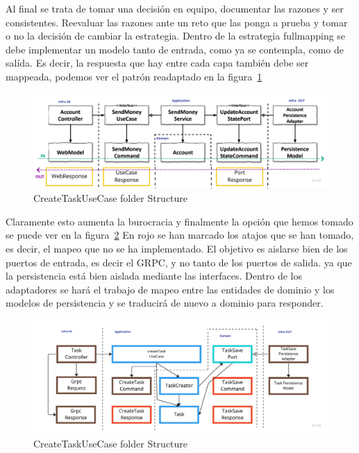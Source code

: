 Al final se trata de tomar una decisión en equipo, documentar las razones y ser consistentes. Reevaluar las razones ante un reto que las ponga a prueba y tomar o no la decisión de cambiar la estrategia. Dentro de la estrategia fullmapping se debe implementar un modelo tanto de entrada, como ya se contempla, como de salída. Es decir, la respuesta que hay entre cada capa también debe ser mappeada, podemos ver el patrón readaptado en la figura~\cref{fig:GetHandMapping}

\begin{figure}[H]
    \centering
    \includegraphics[height=0.2\textheight]{./part/Ejecucion/Seguimiento/CreateTaskUseCase/img/PFM - GetHandMapping}
    \caption{CreateTaskUseCase folder Structure\cite{TomHombergs2019GYHD}}\label{fig:GetHandMapping}
\end{figure}

Claramente esto aumenta la burocracia y finalmente la opción que hemos tomado se puede ver en la figura~\cref{fig:CreateTaskUseCaseMapping} En rojo se han marcado los atajos que se han tomado, es decir, el mapeo que no se ha implementado. El objetivo es aislarse bien de los puertos de entrada, es decir el GRPC, y no tanto de los puertos de salida. ya que la persistencia está bien aislada mediante las interfaces. Dentro de los adaptadores se hará el trabajo de mapeo entre las entidades de dominio y los modelos de persistencia y se traducirá de nuevo a dominio para responder.

\begin{figure}[H]
    \centering
    \includegraphics[height=0.2\textheight]{./part/Ejecucion/Seguimiento/CreateTaskUseCase/img/PFM - FinalMapping}
    \caption{CreateTaskUseCase folder Structure}\label{fig:CreateTaskUseCaseMapping}
\end{figure}

